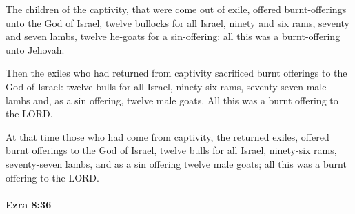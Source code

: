 			\begin{versebox}
					\item[BHS] 
					\item[LXX] 
					\item[ASV] The children of the captivity, that were come out of exile, offered burnt-offerings unto the God of Israel, twelve bullocks for all Israel, ninety and six rams, seventy and seven lambs, twelve he-goats for a sin-offering: all this was a burnt-offering unto Jehovah.
					\item[NIV] Then the exiles who had returned from captivity sacrificed burnt offerings to the God of Israel: twelve bulls for all Israel, ninety-six rams, seventy-seven male lambs and, as a sin offering, twelve male goats. All this was a burnt offering to the LORD.
					\item[NRSV] At that time those who had come from captivity, the returned exiles, offered burnt offerings to the God of Israel, twelve bulls for all Israel, ninety-six rams, seventy-seven lambs, and as a sin offering twelve male goats; all this was a burnt offering to the LORD.
			\end{versebox}

		\paragraph{Ezra 8:36} %
			\label{EZRA-8-36}

